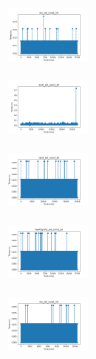 \vspace*{\fill}
\newpage
\vspace*{\fill}

\begin{figure}[H]    
    \centering
    \begin{subfigure}
        \centering
        \includegraphics[width=0.234\textwidth]{img/hs/iris_set_const_20_949004259_time.png}
    \end{subfigure}
    \hfill
    \begin{subfigure}
        \centering
        \includegraphics[width=0.234\textwidth]{img/hs/ecoli_set_const_20_949004259_time.png}
    \end{subfigure}
    \hfill
    \begin{subfigure}
        \centering
        \includegraphics[width=0.234\textwidth]{img/hs/rand_set_const_20_949004259_time.png}
    \end{subfigure}
    \hfill
    \begin{subfigure}
        \centering
        \includegraphics[width=0.234\textwidth]{img/hs/newthyroid_set_const_20_949004259_time.png}
    \end{subfigure}
    \hfill
    \begin{subfigure}
        \centering
        \includegraphics[width=0.234\textwidth]{img/hs/iris_set_const_20_589741062_time.png}

\end{subfigure}
\end{figure}

